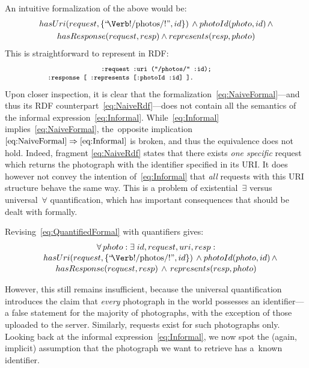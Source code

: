 \documentclass[smallextended]{svjour3}
\begin{document}
{\noindent An intuitive formalization of the above would be:
\begin{multline}\label{eq:NaiveFormal}
    hasUri(request, \{\mbox{``\!\Verb!/photos/!''}, id\})\, \land photoId(photo, id)\, \land \\
    hasResponse(request, resp) \land represents(resp, photo)
\end{multline}
This is straightforward to represent in RDF:
\begin{multline}\label{eq:NaiveRdf}
    \fontsize{8}{10}\texttt{:request :uri ("/photos/" :id);} \\[-.5em]
    \fontsize{8}{10}\texttt{:response [ :represents [:photoId :id] ].}\makebox[3cm]{}
\end{multline}
Upon closer inspection, it is clear that the formalization~\ref{eq:NaiveFormal}---and thus its RDF counterpart~\ref{eq:NaiveRdf}---does not contain all the semantics of the informal expression~\ref{eq:Informal}. While~\ref{eq:Informal} implies~\ref{eq:NaiveFormal}, the~opposite implication \mbox{$\ref{eq:NaiveFormal} \Rightarrow \ref{eq:Informal}$} is broken, and thus the equivalence does not hold. Indeed, fragment \ref{eq:NaiveRdf} states that there exists \emph{one specific} request which returns the photograph with the identifier specified in its URI. It does however not convey the intention of~\ref{eq:Informal} that \emph{all} requests with this URI structure behave the same way. This is a problem of existential~$\exists$ versus universal~$\forall$ quantification, which has important consequences that should be dealt with formally.

Revising~\ref{eq:QuantifiedFormal} with quantifiers gives:
\begin{multline}\label{eq:QuantifiedFormal}
    \makebox[4.4cm]{$\forall\, photo : \exists\; id, request, uri, resp :$} \\[-.2em]
    \shoveleft{hasUri(request, \{\mbox{``\!\Verb!/photos/!''}, id\})\, \land photoId(photo, id) \, \land} \\[-.2em]
    hasResponse(request, resp) \,\land\, represents(resp, photo)
\end{multline}

\noindent However, this still remains insufficient, because the universal quantification introduces the claim that \emph{every} photograph in the world possesses an identifier---a false statement for the majority of photographs, with the exception of those uploaded to the server. Similarly, requests exist for such photographs only. Looking back at the informal expression~\ref{eq:Informal}, we now spot the (again, implicit) assumption that the photograph we want to retrieve has a~known identifier.

}
\end{document}
